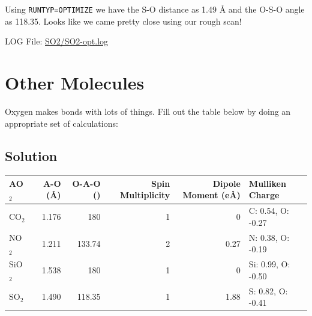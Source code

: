 \documentclass[11pt]{article}
\begin{document}
Using \verb~RUNTYP=OPTIMIZE~ we have the S-O distance as 1.49 \AA{} and the O-S-O angle as 118.35\textdegree{}. Looks like we came pretty close using our rough scan!

LOG File: \url{SO2/SO2-opt.log}

\section{Other Molecules}
\label{sec-4}

Oxygen makes bonds with lots of things. Fill out the table below by doing an appropriate set of calculations:

\subsection{Solution}
\label{sec-4-1}
\begin{center}
\begin{tabular}{lrrrrl}
AO$_{\text{2}}$ & A-O (\AA{}) & O-A-O (\textdegree{}) & Spin Multiplicity & Dipole Moment (e\AA{}) & Mulliken Charge\\
\hline
CO$_{\text{2}}$ & 1.176 & 180 & 1 & 0 & C: 0.54, O: -0.27\\
NO$_{\text{2}}$ & 1.211 & 133.74 & 2 & 0.27 & N: 0.38, O: -0.19\\
SiO$_{\text{2}}$ & 1.538 & 180 & 1 & 0 & Si: 0.99, O: -0.50\\
SO$_{\text{2}}$ & 1.490 & 118.35 & 1 & 1.88 & S: 0.82, O: -0.41\\
\end{tabular}
\end{center}
\end{document}
